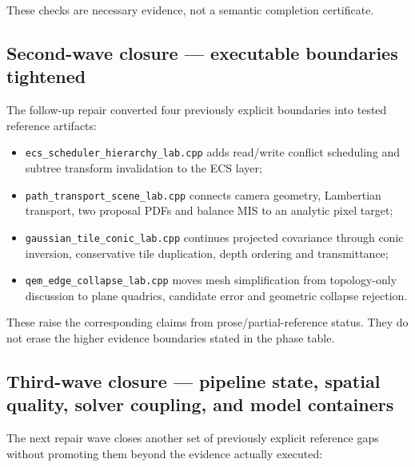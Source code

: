 These checks are necessary evidence, not a semantic completion certificate.

\subsection{Second-wave closure --- executable boundaries tightened}\label{appendix-2358b21a702d-second-wave-closure-executable-boundaries-tightened}

The follow-up repair converted four previously explicit boundaries into tested reference artifacts:

\begin{itemize}
\tightlist
\item
  \texttt{ecs\_scheduler\_hierarchy\_lab.cpp} adds read/write conflict scheduling and subtree transform invalidation to the ECS layer;
\item
  \texttt{path\_transport\_scene\_lab.cpp} connects camera geometry, Lambertian transport, two proposal PDFs and balance MIS to an analytic pixel target;
\item
  \texttt{gaussian\_tile\_conic\_lab.cpp} continues projected covariance through conic inversion, conservative tile duplication, depth ordering and transmittance;
\item
  \texttt{qem\_edge\_collapse\_lab.cpp} moves mesh simplification from topology-only discussion to plane quadrics, candidate error and geometric collapse rejection.
\end{itemize}

These raise the corresponding claims from prose/partial-reference status. They do not erase the higher evidence boundaries stated in the phase table.

\subsection{Third-wave closure --- pipeline state, spatial quality, solver coupling, and model containers}\label{appendix-2358b21a702d-third-wave-closure-pipeline-state-spatial-quality-solver-coupling-and-model-containers}

The next repair wave closes another set of previously explicit reference gaps without promoting them beyond the evidence actually executed:

